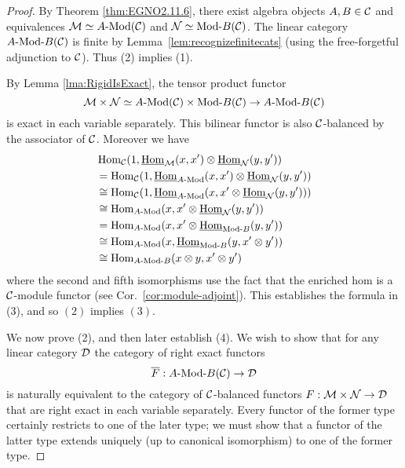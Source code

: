 \documentclass{amsart}
\begin{document}
\begin{proof}  
	 By Theorem \ref{thm:EGNO2.11.6}, there exist algebra objects $A, B \in \mathcal C$ and equivalences $\cM \simeq \Mod{A}{}(\cC)$ and $\cN \simeq \Mod{}{B}(\cC)$. The linear category $\Mod{A }{B}(\cC)$ is finite by Lemma~\ref{lem:recognizefinitecats} (using the free-forgetful adjunction to $\mathcal C$).   Thus (2) implies (1).
	 
	 By Lemma \ref{lma:RigidIsExact}, the tensor product functor
	\begin{equation*}
		\cM \times \cN \simeq \Mod{A}{}(\cC) \times  \Mod{}{B}(\cC) \to \Mod{A}{B}(\cC)
	\end{equation*}
	is exact in each variable separately. This bilinear functor is also $\mathcal C$-balanced by the associator of $\mathcal C$. Moreover we have
	\begin{align*}
		&\Hom_{\cC}(1, \IHom_{\cM}(x,x') \otimes \IHom_{\cN}(y, y')) \\
		& = \Hom_{\cC}(1, \IHom_{\Mod{A}{}}(x,x') \otimes \IHom_{\cN}(y, y')) \\
		&\cong \Hom_{\cC}(1, \IHom_{\Mod{A}{}}(x,x' \otimes \IHom_{\cN}(y, y')) ) \\
		& \cong \Hom_{\Mod{A}{}}(x, x' \otimes \IHom_{\cN}(y, y') ) \\
		& = \Hom_{\Mod{A}{}}(x, x' \otimes \IHom_{\Mod{}{B}}(y, y') )\\
		& \cong \Hom_{\Mod{A}{}}(x,  \IHom_{\Mod{}{B}}(y, x' \otimes y') )\\
		& \cong \Hom_{\Mod{A}{B}}(x \otimes y, x' \otimes y')
	\end{align*} 
where the second and fifth isomorphisms use the fact that the enriched hom is a $\mathcal C$-module functor (see Cor.~\ref{cor:module-adjoint}). This establishes the formula in (3), and so $(2)$ implies $(3)$. 

	We now prove (2), and then later establish (4).  We wish to show that for any linear category $\mathcal D$ the category of right exact functors 
\begin{equation*}
	\overline{F}:\Mod{A}{B}(\cC) \to \cD
\end{equation*}
	is naturally equivalent to the category of $\mathcal C$-balanced functors $F:\mathcal M \times \mathcal N \to \mathcal D$ that are right exact in each variable separately. Every functor of the former type certainly restricts to one of the later type; we must show that a functor of the latter type extends uniquely (up to canonical isomorphism) to one of the former type. 
	

\end{proof}
\end{document}
